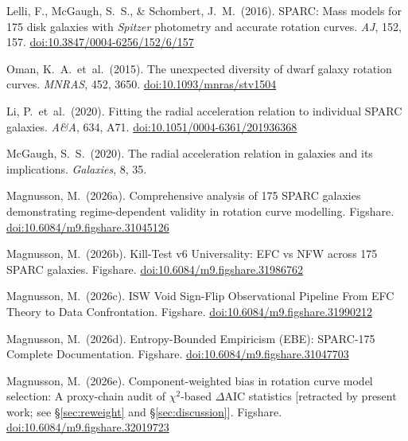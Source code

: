 \documentclass[11pt,a4paper]{article}
\begin{document}
\sloppy
\begin{small}
\begin{enumerate}[leftmargin=2em,label={[\arabic*]},itemsep=2pt]

\item Lelli, F., McGaugh, S.~S., \& Schombert, J.~M.\ (2016).
  SPARC: Mass models for 175 disk galaxies with \textit{Spitzer} photometry
  and accurate rotation curves.
  \textit{AJ}, 152, 157.
  \href{https://doi.org/10.3847/0004-6256/152/6/157}{doi:10.3847/0004-6256/152/6/157}

\item Oman, K.~A.\ et~al.\ (2015).
  The unexpected diversity of dwarf galaxy rotation curves.
  \textit{MNRAS}, 452, 3650.
  \href{https://doi.org/10.1093/mnras/stv1504}{doi:10.1093/mnras/stv1504}

\item Li, P.\ et~al.\ (2020).
  Fitting the radial acceleration relation to individual SPARC galaxies.
  \textit{A\&A}, 634, A71.
  \href{https://doi.org/10.1051/0004-6361/201936368}{doi:10.1051/0004-6361/201936368}

\item McGaugh, S.~S.\ (2020).
  The radial acceleration relation in galaxies and its implications.
  \textit{Galaxies}, 8, 35.

\item Magnusson, M.\ (2026a).
  Comprehensive analysis of 175 SPARC galaxies demonstrating
  regime-dependent validity in rotation curve modelling.
  Figshare.
  \href{https://doi.org/10.6084/m9.figshare.31045126}{doi:10.6084/m9.figshare.31045126}

\item Magnusson, M.\ (2026b).
  Kill-Test v6 Universality: EFC vs NFW across 175 SPARC galaxies.
  Figshare.
  \href{https://doi.org/10.6084/m9.figshare.31986762}{doi:10.6084/m9.figshare.31986762}

\item Magnusson, M.\ (2026c).
  ISW Void Sign-Flip Observational Pipeline From EFC Theory to Data
  Confrontation.
  Figshare.
  \href{https://doi.org/10.6084/m9.figshare.31990212}{doi:10.6084/m9.figshare.31990212}

\item Magnusson, M.\ (2026d).
  Entropy-Bounded Empiricism (EBE): SPARC-175 Complete Documentation.
  Figshare.
  \href{https://doi.org/10.6084/m9.figshare.31047703}{doi:10.6084/m9.figshare.31047703}

\item Magnusson, M.\ (2026e).
  Component-weighted bias in rotation curve model selection: A
  proxy-chain audit of $\chi^2$-based $\Delta$AIC statistics
  [retracted by present work; see \S\ref{sec:reweight} and \S\ref{sec:discussion}].
  Figshare.
  \href{https://doi.org/10.6084/m9.figshare.32019723}{doi:10.6084/m9.figshare.32019723}

\end{enumerate}
\end{small}
\end{document}
